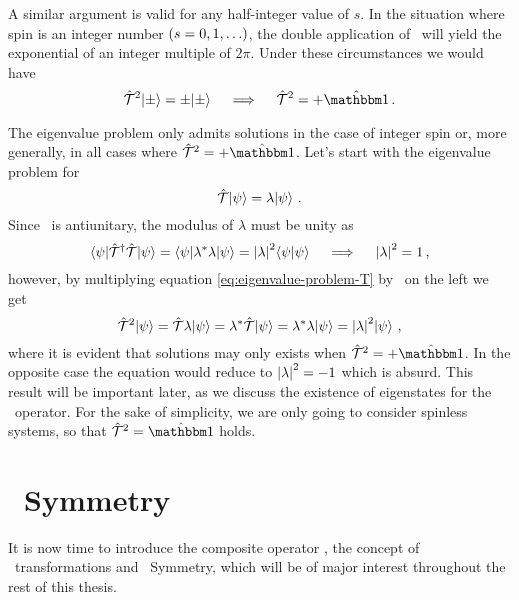             A similar argument is valid for any half-integer value of $s$. In the situation where spin is an integer number $\pqty{s = 0,1,\ldots}$, the double application of \hK\ will yield the exponential of an integer multiple of $2\pi$. Under these circumstances we would have
            \begin{equation*}
                \hT^2\! \ket{\pm} = \pm\!\ket{\pm}
                \quad\implies\quad
                \hT^2 = +\togglehat{\idM}
                \myperiod
            \end{equation*}

            The eigenvalue problem only admits solutions in the case of integer spin or, more generally, in all cases where $\hT^2 = +\togglehat{\idM}$. Let's start with the eigenvalue problem for \hT
            \begin{equation}
                \label{eq:eigenvalue-problem-T}
                \mathcal{\hat{T}}\! \ket{\psi} = \lambda\! \ket{\psi}
                \,\text{.}
            \end{equation}
            Since \hT\ is antiunitary, the modulus of $\lambda$ must be unity as
            \begin{equation*}
                \bra{\psi}\!\mathcal{\hat{T}}^\dag \mathcal{\hat{T}} \!\ket{\psi}
                = \bra{\psi} \!\lambda^* \lambda\!\ket{\psi}
                = \abs{\lambda}^2 \!\braket{\psi}{\psi}
                \quad\implies\quad
                \abs{\lambda}^2 = 1
                \,\text{,}
            \end{equation*}
            however, by multiplying equation \eqref{eq:eigenvalue-problem-T} by \hT\ on the left we get
            \begin{equation*}
                \mathcal{\hat{T}}^2\! \ket{\psi}
                = \mathcal{\hat{T}} \lambda\! \ket{\psi}
                = \lambda^* \mathcal{\hat{T}}\! \ket{\psi}
                = \lambda^* \lambda\! \ket{\psi}
                = \abs{\lambda}^2\! \ket{\psi}
                \,\text{,}
            \end{equation*}
            where it is evident that solutions may only exists when $\hT^2 = +\togglehat{\idM}$. In the opposite case the equation would reduce to $\abs{\lambda}^2 = -1$ which is absurd. This result will be important later, as we discuss the existence of eigenstates for the \hPT\ operator. For the sake of simplicity, we are only going to consider spinless systems, so that $\hT^2 = \togglehat{\idM}$ holds.

    \section{\PT\ Symmetry}\label{s:pt-symmetry}
        It is now time to introduce the composite operator \hPT, the concept of \PT\ transformations and \PT\ Symmetry, which will be of major interest throughout the rest of this thesis.

